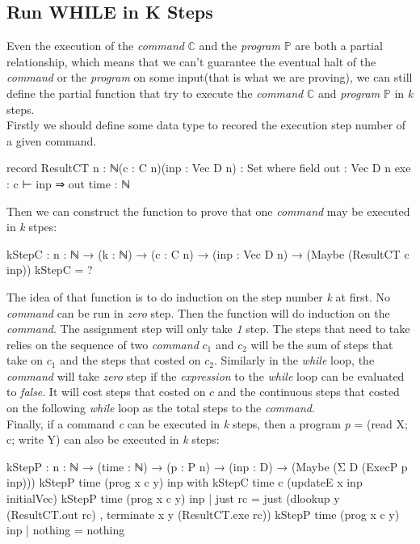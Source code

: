 \documentclass{jfrarticle}
\newcommand{\md}[1]{$\mathds{#1}$}
\begin{document}
\subsection{Run WHILE in K Steps}
Even the execution of the \textit{command} \md{C} and the \textit{program} \md{P} are both a partial relationship, which means that we can't guarantee the eventual halt of the \textit{command} or the \textit{program} on some input(that is what we are proving),
we can still define the partial function that try to execute the \textit{command} \md{C} and \textit{program} \md{P} in \textit{k} steps.\\
Firstly we should define some data type to recored the execution step number of a given command.
\begin{code}[fontsize=\small]
record ResultCT {n : ℕ}(c : C n)(inp : Vec D n) : Set where
  field
    out  : Vec D n
    exe  : c ⊢ inp ⇒ out
    time : ℕ
\end{code}
Then we can construct the function to prove that one \textit{command} may be executed in \textit{k} stpes:
\begin{code}[fontsize=\small]
kStepC : {n : ℕ} → (k : ℕ) → (c : C n) → (inp : Vec D n) 
	→ (Maybe (ResultCT c inp))
kStepC = ?
\end{code}
The idea of that function is to do induction on the step number \textit{k} at first.
No \textit{command} can be run in \textit{zero} step.
Then the function will do induction on the \textit{command}.
The assignment step will only take \textit{1} step.
The steps that need to take relies on the sequence of two \textit{command} $c_1$ and $c_2$ will be the sum of steps that take on $c_1$ and the steps that costed on $c_2$.
Similarly in the \textit{while} loop, the \textit{command} will take \textit{zero} step if the \textit{expression} to the \textit{while} loop can be evaluated to \textit{false}.
It will cost steps that costed on $c$ and the continuous steps that costed on the following \textit{while} loop as the total steps to the \textit{command}.\\
Finally, if a command \textit{c} can be executed in \textit{k} steps, then a program \textit{p} = (read X; c; write Y) can also be executed in \textit{k} steps:
\begin{code}[fontsize=\small]
kStepP : {n : ℕ} → (time : ℕ) → (p : P n) → (inp : D) 
	→ (Maybe (Σ D (ExecP p inp)))
kStepP time (prog x c y) inp with kStepC time c (updateE x inp initialVec)
kStepP time (prog x c y) inp | just rc = just (dlookup y (ResultCT.out rc) , 
					       terminate x y (ResultCT.exe rc))
kStepP time (prog x c y) inp | nothing = nothing
\end{code}
\end{document}
